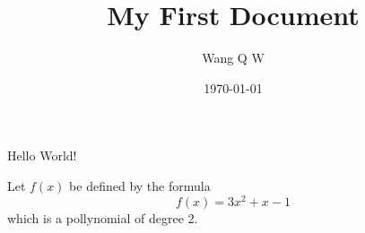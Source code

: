 \documentclass{article} %
\title{My First Document}
\author{Wang Q W}
\date{\today}
\begin{document}
	\maketitle
	
	Hello World!
	
	Let $f(x)$ be defined by the formula
	$$f(x)=3x^2+x-1$$which is a pollynomial of
	degree 2.
\end{document}
